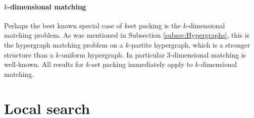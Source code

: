 \paragraph{$k$-dimensional matching} Perhaps the best known special case of $k$set packing is the $k$-dimensional matching problem. As was mentioned in Subsection \ref{subsec:Hypergraphs}, this is the hypergraph matching problem on a $k$-partite hypergraph, which is a stronger structure than a $k$-uniform hypergraph. In particular 3-dimensional matching is well-known. All results for $k$-set packing immediately apply to $k$-dimensional matching. %



\section{Local search}\label{sec:LocalSearch}


